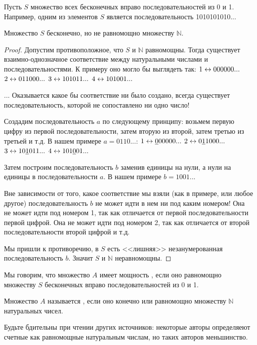 {Пусть $S$ множество всех бесконечных вправо последовательностей из 0 и 1. Например, одним из элементов $S$ является последовательность 1010101010...

\begin{myth} Множество $S$ бесконечно, но не равномощно множеству $\mathbb{N}$.
\end{myth}

\begin{proof} Допустим противоположное, что $S$ и $\mathbb{N}$ равномощны. Тогда существует взаимно-однозначное соответствие между натуральными числами и последовательностями. К примеру оно могло бы выглядеть так:
$1 \leftrightarrow 000000...$
$2 \leftrightarrow 011000...$
$3 \leftrightarrow 101011...$
$4 \leftrightarrow 101001...$

...
Оказывается какое бы соответствие ни было создано, всегда существует последовательность, которой не сопоставлено ни одно число!

Создадим последовательность $a$ по следующему принципу: возьмем первую цифру из первой последовательности, затем вторую из второй, затем третью из третьей и т.д. В нашем примере $a=0110...$:
$1 \leftrightarrow \underline{0}00000...$
$2 \leftrightarrow 0\underline{1}1000...$
$3 \leftrightarrow 10\underline{1}011...$
$4 \leftrightarrow 101\underline{0}01...$


Затем построим последовательность $b$ заменив единицы на нули, а нули на единицы в последовательности $a$. В нашем примере $b=1001...$

Вне зависимости от того, какое соответствие мы взяли (как в примере, или любое другое) последовательность $b$ не может идти в нем ни под каким номером! Она не может идти под номером 1, так как отличается от первой последовательности первой цифрой. Она не может идти под номером 2, так как отличается от второй последовательности второй цифрой и т.д.

Мы пришли к противоречию, в $S$ есть <<лишняя>> незанумерованная последовательность $b$. Значит $S$ и $\mathbb{N}$ неравномощны.
\end{proof}
\begin{mydef} Мы говорим, что множество $A$ имеет мощность ,  если оно равномощно множеству $S$ бесконечных вправо последовательностей из 0 и 1.
\end{mydef}
\begin{mydef} Множество $A$ называется ,  если оно конечно или равномощно множеству $\mathbb{N}$ натуральных чисел.
\end{mydef}
Будьте бдительны при чтении других источников: некоторые авторы определяеют счетные как равномощные натуральным числам, но таких авторов меньшинство.

}
